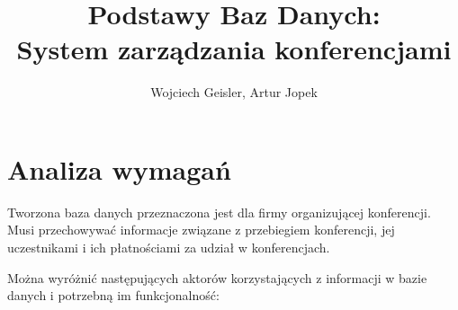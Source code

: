 \documentclass[12pt]{article}
\begin{document}
\title{Podstawy Baz Danych:\\System zarządzania konferencjami}
\author{Wojciech Geisler, Artur Jopek}
\date{}
\maketitle

\tableofcontents

\clearpage

\section{Analiza wymagań}
Tworzona baza danych przeznaczona jest dla firmy organizującej konferencji. Musi przechowywać informacje związane z przebiegiem konferencji, jej uczestnikami i ich płatnościami za udział w konferencjach.

%
%
%



Można wyróżnić następujących aktorów korzystających z informacji w bazie danych i potrzebną im funkcjonalność:
\end{document}
